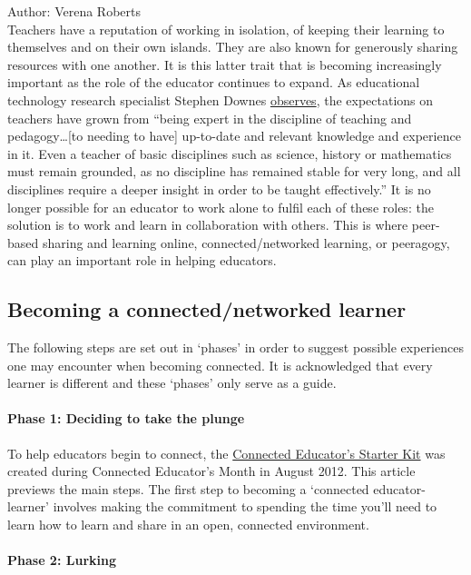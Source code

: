 Author: Verena Roberts \\

Teachers have a reputation of working in
isolation, of keeping their learning to themselves and on their own
islands. They are also known for generously sharing resources with one
another. It is this latter trait that is becoming increasingly important
as the role of the educator continues to expand. As educational
technology research specialist Stephen Downes
\href{http://www.huffingtonpost.com/stephen-downes/the-role-of-the-educator\_b\_790937.html}{observes},
the expectations on teachers have grown from ``being expert in the
discipline of teaching and pedagogy\ldots{}{[}to needing to have{]}
up-to-date and relevant knowledge and experience in it. Even a teacher
of basic disciplines such as science, history or mathematics must remain
grounded, as no discipline has remained stable for very long, and all
disciplines require a deeper insight in order to be taught
effectively.'' It is no longer possible for an educator to work alone to
fulfil each of these roles: the solution is to work and learn in
collaboration with others. This is where peer-based sharing and learning
online, connected/networked learning, or peeragogy, can play an
important role in helping educators.

\subsection{Becoming a connected/networked learner}

The following steps are set out in `phases' in order to suggest possible
experiences one may encounter when becoming connected. It is
acknowledged that every learner is different and these `phases' only
serve as a guide.

\paragraph{Phase 1: Deciding to take the plunge}

To help educators begin to connect, the
\href{https://dl.dropboxusercontent.com/u/38904447/starter-kit-final.pdf}{Connected
Educator's Starter Kit} was created during Connected Educator's Month in
August 2012. This article previews the main steps. The first step to
becoming a `connected educator-learner' involves making the commitment
to spending the time you'll need to learn how to learn and share in an
open, connected environment.

\paragraph{Phase 2: Lurking}

